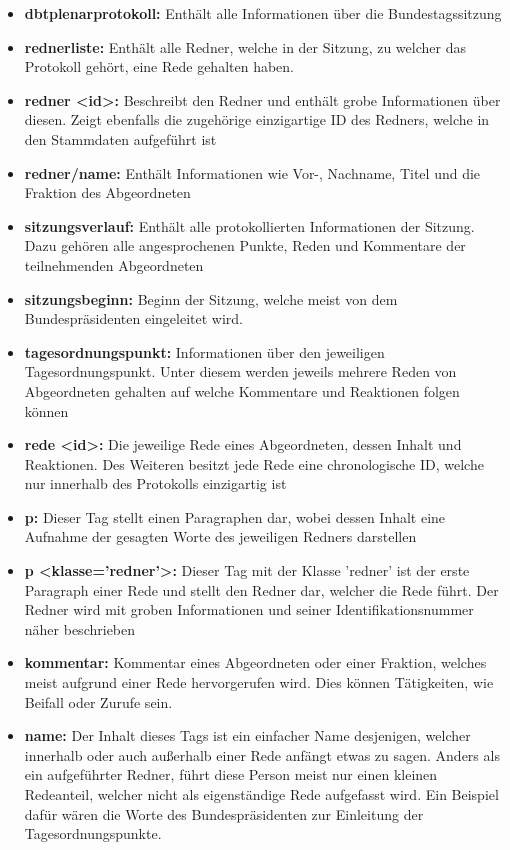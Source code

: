 \begin{itemize}
    \item \textbf{dbtplenarprotokoll:} Enthält alle Informationen über die Bundestagssitzung
    \item \textbf{rednerliste:} Enthält alle Redner, welche in der Sitzung, zu welcher das Protokoll gehört, eine Rede gehalten haben.
    \item \textbf{redner <id>:} Beschreibt den Redner und enthält grobe Informationen über diesen. Zeigt ebenfalls die zugehörige einzigartige ID des Redners, welche in den Stammdaten aufgeführt ist
    \item \textbf{redner/name:} Enthält Informationen wie Vor-, Nachname, Titel und die Fraktion des Abgeordneten
    \item \textbf{sitzungsverlauf:} Enthält alle protokollierten Informationen der Sitzung. Dazu gehören alle angesprochenen Punkte, Reden und Kommentare der teilnehmenden Abgeordneten
    \item \textbf{sitzungsbeginn:} Beginn der Sitzung, welche meist von dem Bundespräsidenten eingeleitet wird. 
    \item \textbf{tagesordnungspunkt:} Informationen über den jeweiligen Tagesordnungspunkt. Unter diesem werden jeweils mehrere Reden von Abgeordneten gehalten auf welche Kommentare und Reaktionen folgen können
    \item \textbf{rede <id>:} Die jeweilige Rede eines Abgeordneten, dessen Inhalt und Reaktionen. Des Weiteren besitzt jede Rede eine chronologische ID, welche nur innerhalb des Protokolls einzigartig ist
    \item \textbf{p:} Dieser Tag stellt einen Paragraphen dar, wobei dessen Inhalt eine Aufnahme der gesagten Worte des jeweiligen Redners darstellen 
    \item \textbf{p <klasse='redner'>:} Dieser Tag mit der Klasse 'redner' ist der erste Paragraph einer Rede und stellt den Redner dar, welcher die Rede führt. Der Redner wird mit groben Informationen und seiner Identifikationsnummer näher beschrieben
    \item \textbf{kommentar:} Kommentar eines Abgeordneten oder einer Fraktion, welches meist aufgrund einer Rede hervorgerufen wird. Dies können Tätigkeiten, wie Beifall oder Zurufe sein.
    \item \textbf{name:} Der Inhalt dieses Tags ist ein einfacher Name desjenigen, welcher innerhalb oder auch außerhalb einer Rede anfängt etwas zu sagen. Anders als ein aufgeführter Redner, führt diese Person meist nur einen kleinen Redeanteil, welcher nicht als eigenständige Rede aufgefasst wird. Ein Beispiel dafür wären die Worte des Bundespräsidenten zur Einleitung der Tagesordnungspunkte. 
\end{itemize}

